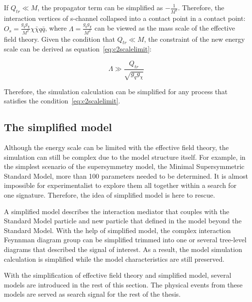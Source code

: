 If $Q_{tr} \ll M$, the propagator term can be simplified as $-\frac{1}{M^2}$. Therefore, the interaction vertices of s-channel collapsed into a contact point in a contact point: $O_{s}=\frac{g_{q}g_{\chi}}{M^{2}}\chi\bar{\chi}q\bar{q}$, where $\Lambda=\frac{g_{q}g_{\chi}}{M^{2}}$ can be viewed as the mass scale of the effective field theory. Given the condition that $Q_{tr} \ll M$, the constraint of the new energy scale can be derived as equation~\ref{eq:c2scalelimit}:

\begin{equation}
  \Lambda \gg \frac{Q_{tr}}{\sqrt{g_{q}g_{\chi}}}
  \label{eq:c2scalelimit}
\end{equation}

Therefore, the simulation calculation can be simplified for any process that satisfies the condition~\ref{eq:c2scalelimit}.

\subsection{The simplified model}
\par Although the energy scale can be limited with the effective field theory, the simulation can still be complex due to the model structure itself. For example, in the simplest scenario of the supersymmetry model, the Minimal Supersymmetric Standard Model, more than 100 parameters needed to be determined. It is almost impossible for experimentalist to explore them all together within a search for one signature. Therefore, the idea of simplified model\cite{SimplifiedModels-Alves2012} is here to rescue.

\par A simplified model describes the interaction mediator that couples with the Standard Model particle and new particle that defined in the model beyond the Standard Model. With the help of simplified model, the complex interaction Feynnman diagram group can be simplified trimmed into one or several tree-level diagrams that described the signal of interest. As a result, the model simulation calculation is simplified while the model characteristics are still preserved. 

\par With the simplification of effective field theory and simplified model, several models are introduced in the rest of this section. The physical events from these models are served as search signal for the rest of the thesis.

